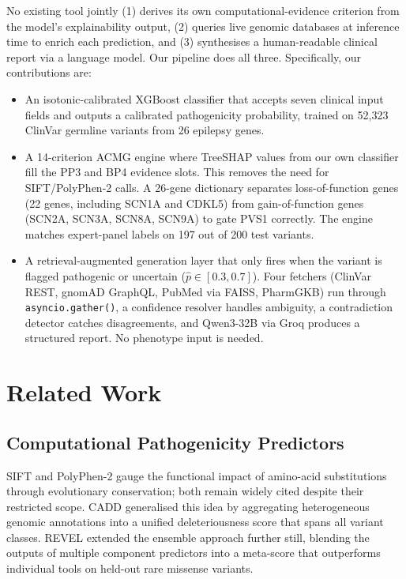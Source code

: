 \documentclass[12pt,a4paper]{article}
\begin{document}
No existing tool jointly (1) derives its own computational-evidence
criterion from the model's explainability output, (2) queries live
genomic databases at inference time to enrich each prediction, and
(3) synthesises a human-readable clinical report via a language
model. Our pipeline does all three. Specifically, our
contributions are:

\begin{itemize}
  \item An isotonic-calibrated XGBoost classifier that accepts
        seven clinical input fields and outputs a calibrated
        pathogenicity probability, trained on 52,323 ClinVar
        germline variants from 26 epilepsy genes.
  \item A 14-criterion ACMG engine where TreeSHAP values from
        our own classifier fill the PP3 and BP4 evidence slots.
        This removes the need for SIFT/PolyPhen-2 calls. A
        26-gene dictionary separates loss-of-function genes
        (22 genes, including SCN1A and CDKL5) from
        gain-of-function genes (SCN2A, SCN3A, SCN8A, SCN9A) to gate
        PVS1 correctly. The engine matches expert-panel labels
        on 197 out of 200 test variants.
  \item A retrieval-augmented generation layer that only fires
        when the variant is flagged pathogenic or uncertain
        ($\hat{p}\!\in\![0.3,0.7]$). Four fetchers (ClinVar
        REST, gnomAD GraphQL, PubMed via FAISS, PharmGKB) run
        through \texttt{asyncio.gather()}, a confidence resolver
        handles ambiguity, a contradiction detector catches
        disagreements, and Qwen3-32B via Groq produces a
        structured report. No phenotype input is needed.
\end{itemize}

\section{Related Work}

\subsection{Computational Pathogenicity Predictors}

SIFT and PolyPhen-2 gauge the functional impact of amino-acid
substitutions through evolutionary conservation; both remain
widely cited despite their restricted scope. CADD \cite{cadd2014}
generalised this idea by aggregating heterogeneous genomic
annotations into a unified deleteriousness score that spans all
variant classes. REVEL \cite{revel2016} extended the ensemble
approach further still, blending the outputs of multiple component
predictors into a meta-score that outperforms individual tools
on held-out rare missense variants.
\end{document}
